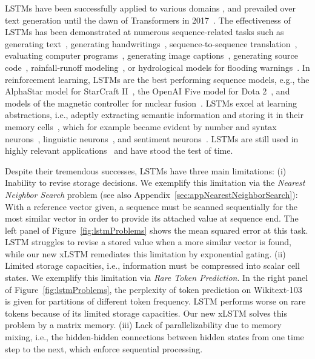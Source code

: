 LSTMs have been successfully applied to various domains \citep{Hochreiter:01,Hochreiter:07,Schmidhuber:15}, and prevailed over text generation until the dawn of Transformers in 2017~\citep{Vaswani:17}. The effectiveness of LSTMs has been demonstrated at numerous sequence-related tasks such as generating text~\citep{Graves:13,Karpathy:15blog}, generating handwritings~\citep{Graves:13}, sequence-to-sequence translation~\citep{Sutskever:14nips}, evaluating computer programs~\citep{Zaremba:14arxiv}, generating image captions~\citep{Karpathy:15,Hossain:19}, generating source code~\citep{Karpathy:15blog}, rainfall-runoff modeling~\citep{Kratzert:18,Kratzert:19}, or hydrological models for flooding warnings~\citep{Nearing:24}. In reinforcement learning, LSTMs are the best performing sequence models, e.g., the AlphaStar model for StarCraft II~\citep{Vinyals:17short}, the OpenAI Five model for Dota 2~\citep{OpenAI:19}, and models of the magnetic controller for nuclear fusion~\citep{Degrave:22short}. LSTMs excel at learning abstractions, i.e., adeptly extracting semantic information and storing it in their memory cells~\citep{Karpathy:15blog}, which for example became evident by number and syntax neurons~\citep{Lakretz:19}, linguistic neurons~\citep{Bau:19}, and sentiment neurons~\citep{Radford:17arxiv}. LSTMs are still used in highly relevant applications~\citep{Degrave:22short,Nearing:24} and have stood the test of time. 

Despite their tremendous successes, LSTMs have three main limitations: (i) Inability to revise storage decisions. We exemplify this limitation via the 
{\it Nearest Neighbor Search} problem (see also Appendix~\ref{sec:appNearestNeighborSearch}): 
With a reference vector given, a sequence must be scanned sequentially for the most similar vector in order to provide its attached value at sequence end. The left panel of Figure~\ref{fig:lstmProblems} shows the mean squared error at this task. LSTM struggles to revise a stored value when a more similar vector is found, while our new xLSTM remediates this limitation by exponential gating. (ii) Limited storage capacities, i.e., information must be compressed into scalar cell states. We exemplify this limitation via {\it Rare Token Prediction}. In the right panel of Figure~\ref{fig:lstmProblems},
the perplexity of token prediction on Wikitext-103~\citep{Merity:17} is given for partitions of different token frequency. LSTM performs worse on rare tokens because of its limited storage capacities. Our new xLSTM solves this problem by a matrix memory. (iii) Lack of parallelizability due to memory mixing, i.e., the hidden-hidden connections between hidden states from one time step to the next, which enforce sequential processing. 

